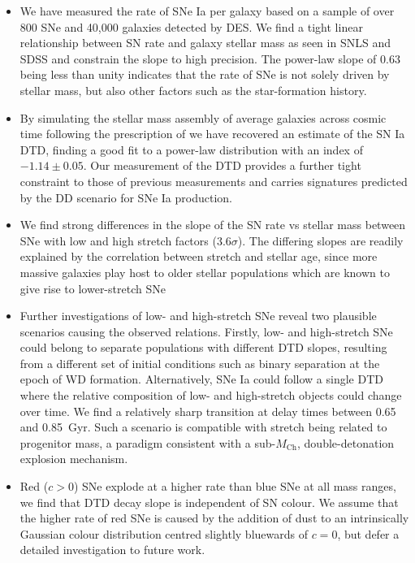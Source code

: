 \documentclass[fleqn,usenatbib]{mnras}
\begin{document}
\begin{itemize}
\item We have measured the rate of SNe Ia per galaxy based on a sample of over 800 SNe and 40,000 galaxies detected by DES. We find a tight linear relationship between SN rate and galaxy stellar mass as seen in SNLS \citep{Sullivan2006} and SDSS \citep{Smith2012} and constrain the slope to high precision. The power-law slope of 0.63 being less than unity indicates that the rate of SNe is not solely driven by stellar mass, but also other factors such as the star-formation history.

\item By simulating the stellar mass assembly of average galaxies across cosmic time following the prescription of  we have recovered an estimate of the SN Ia DTD, finding a good fit to a power-law distribution with an index of $-1.14 \pm0.05$. Our measurement of the DTD provides a further tight constraint to those of previous measurements \citep[e.g.][]{Graur2013,Maoz2017} and carries signatures predicted by the DD scenario for SNe Ia production.

\item We find strong differences in the slope of the SN rate vs stellar mass between SNe with low and high stretch factors ($3.6\sigma$). The differing slopes are readily explained by the correlation between stretch and stellar age, since more massive galaxies play host to older stellar populations which are known to give rise to lower-stretch SNe

\item Further investigations of low- and high-stretch SNe reveal two plausible scenarios causing the observed relations. Firstly, low- and high-stretch SNe could belong to separate populations with different DTD slopes, resulting from a different set of initial conditions such as binary separation at the epoch of WD formation. Alternatively, SNe Ia could follow a single DTD where the relative composition of low- and high-stretch objects could change over time. We find a relatively sharp transition at delay times between 0.65 and 0.85~Gyr. Such a scenario is compatible with stretch being related to progenitor mass, a paradigm consistent with a sub-$M_{\mathrm{Ch}}$, double-detonation explosion mechanism. 

\item Red ($c>0$) SNe explode at a higher rate than blue SNe at all mass ranges, we find that DTD decay slope is independent of SN colour. We assume that the higher rate of red SNe is caused by the addition of dust to an intrinsically Gaussian colour distribution centred slightly bluewards of $c=0$, but defer a detailed investigation to future work.
\end{itemize}
\end{document}
